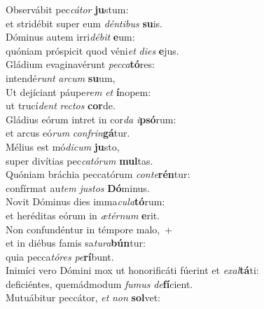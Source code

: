 \evenverse Observábit pec\textit{cá}\textit{tor} \textbf{ju}stum:~\*\\
\evenverse et stridébit super eum \textit{dén}\textit{ti}\textit{bus} \textbf{su}is.\\
\oddverse Dóminus autem irri\textit{dé}\textit{bit} \textbf{e}um:~\*\\
\oddverse quóniam próspicit quod véni\textit{et} \textit{di}\textit{es} \textbf{e}jus.\\
\evenverse Gládium evaginavérunt \textit{pec}\textit{ca}\textbf{tó}res:~\*\\
\evenverse intendé\textit{runt} \textit{ar}\textit{cum} \textbf{su}um,\\
\oddverse Ut dejíciant páupe\textit{rem} \textit{et} \textbf{í}nopem:~\*\\
\oddverse ut trucí\textit{dent} \textit{re}\textit{ctos} \textbf{cor}de.\\
\evenverse Gládius eórum intret in cor\textit{da} \textit{i}\textbf{psó}rum:~\*\\
\evenverse et arcus eó\textit{rum} \textit{con}\textit{frin}\textbf{gá}tur.\\
\oddverse Mélius est mó\textit{di}\textit{cum} \textbf{ju}sto,~\*\\
\oddverse super divítias pec\textit{ca}\textit{tó}\textit{rum} \textbf{mul}tas.\\
\evenverse Quóniam bráchia peccatórum \textit{con}\textit{te}\textbf{rén}tur:~\*\\
\evenverse confírmat au\textit{tem} \textit{ju}\textit{stos} \textbf{Dó}minus.\\
\oddverse Novit Dóminus dies imma\textit{cu}\textit{la}\textbf{tó}rum:~\*\\
\oddverse et heréditas eórum in \textit{æ}\textit{tér}\textit{num} \textbf{e}rit.\\
\evenverse Non confundéntur in témpore malo,~+\\
\evenverse  et in diébus famis sa\textit{tu}\textit{ra}\textbf{bún}tur:~\*\\
\evenverse quia pecca\textit{tó}\textit{res} \textit{pe}\textbf{rí}bunt.\\
\oddverse Inimíci vero Dómini mox ut honorificáti fúerint et \textit{e}\textit{xal}\textbf{tá}ti:~\*\\
\oddverse deficiéntes, quemádmodum \textit{fu}\textit{mus} \textit{de}\textbf{fí}cient.\\
\evenverse Mutuábitur peccátor, \textit{et} \textit{non} \textbf{sol}vet:~\*\\
